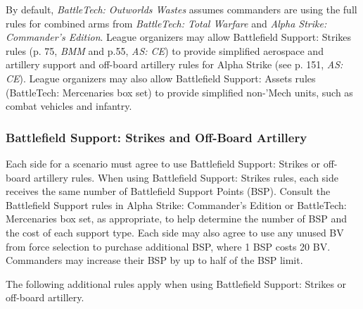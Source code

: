 By default, \emph{BattleTech: Outworlds Wastes} assumes commanders are using the full rules for combined arms from \emph{BattleTech: Total Warfare} and \emph{Alpha Strike: Commander's Edition}.
League organizers may allow Battlefield Support: Strikes rules (p. 75, \emph{BMM}  and p.55, \emph{AS: CE}) to provide simplified aerospace and artillery support and off-board artillery rules for Alpha Strike (see p. 151, \emph{AS: CE}).
League organizers may also allow Battlefield Support: Assets rules (BattleTech: Mercenaries box set) to provide simplified non-'Mech units, such as combat vehicles and infantry.

\subsubsection{Battlefield Support: Strikes and Off-Board Artillery}

Each side for a scenario must agree to use Battlefield Support: Strikes or off-board artillery rules.
When using Battlefield Support: Strikes rules, each side receives the same number of Battlefield Support Points (BSP).
Consult the Battlefield Support rules in Alpha Strike: Commander's Edition or BattleTech: Mercenaries box set, as appropriate, to help determine the number of BSP and the cost of each support type.
Each side may also agree to use any unused BV from force selection to purchase additional BSP, where 1 BSP costs 20 BV.
Commanders may increase their BSP by up to half of the BSP limit.

The following additional rules apply when using Battlefield Support: Strikes or off-board artillery.

